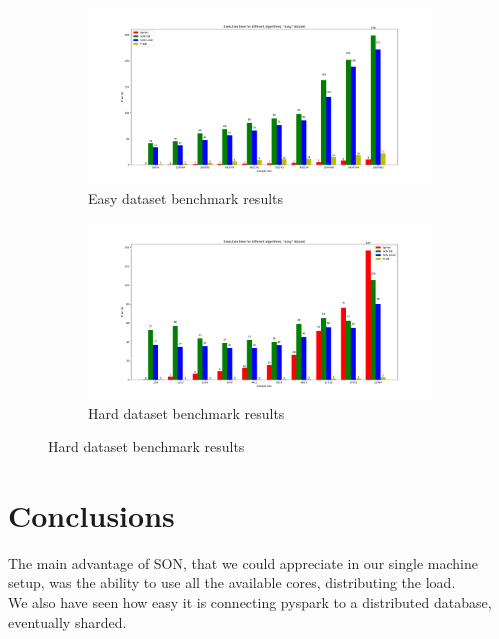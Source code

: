 \documentclass[a4paper]{article}
\begin{document}
	\begin{figure}[h]
		\centering
		\begin{subfigure}[b]{1\textwidth}
			\centering
			\includegraphics[width=\textwidth]{benchmarkeasy.png}
         	\caption{Easy dataset benchmark results}
         	\label{fig:easybenchmark}
		\end{subfigure}
		\hfill
		
		\begin{subfigure}[b]{1\textwidth}
			\centering
			\includegraphics[width=\textwidth]{benchmarkhard.png}
         	\caption{Hard dataset benchmark results}
         	\label{fig:hardbenchmark}
		\end{subfigure}
		\hfill
		
	\end{figure}

	
	\section{Conclusions}
	The main advantage of SON, that we could appreciate in our single machine setup, was the ability to use all the available cores, distributing the load.\\
	We also have seen how easy it is connecting pyspark to a distributed database, eventually sharded.
\end{document}
